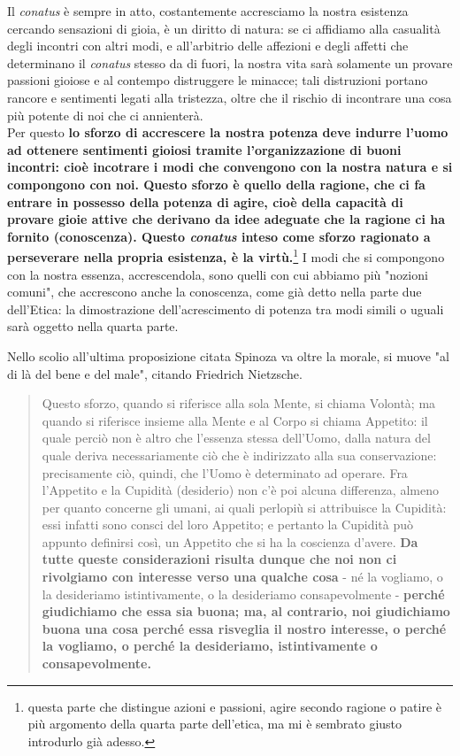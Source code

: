 Il \textit{conatus} è sempre in atto, costantemente accresciamo la nostra esistenza cercando sensazioni di gioia, è un diritto di natura: se ci affidiamo alla casualità degli incontri con altri modi, e all'arbitrio delle affezioni e degli affetti che determinano il \textit{conatus} stesso da di fuori, la nostra vita sarà solamente un provare passioni gioiose e al contempo distruggere le minacce; tali distruzioni portano rancore e sentimenti legati alla tristezza, oltre che il rischio di incontrare una cosa più potente di noi che ci annienterà.\\
Per questo  \textbf{lo sforzo di accrescere la nostra potenza deve indurre l'uomo ad ottenere sentimenti gioiosi tramite l'organizzazione di buoni incontri: cioè incotrare i modi che convengono con la nostra natura e si compongono con noi. Questo sforzo è quello della ragione, che ci fa entrare in possesso della potenza di agire, cioè della capacità di provare gioie attive che derivano da idee adeguate che la ragione ci ha fornito (conoscenza). Questo \textit{conatus} inteso come sforzo ragionato a perseverare nella propria esistenza, è la virtù.}\footnote{questa parte che distingue azioni e passioni, agire secondo ragione o patire è più argomento della quarta parte dell'etica, ma mi è sembrato giusto introdurlo già adesso.} I modi che si compongono con la nostra essenza, accrescendola, sono quelli con cui abbiamo più "nozioni comuni", che accrescono anche la conoscenza, come già detto nella parte due dell'Etica: la dimostrazione dell'acrescimento di potenza tra modi simili o uguali sarà oggetto nella quarta parte.

Nello scolio all'ultima proposizione citata Spinoza va oltre la morale, si muove "al di là del bene e del male", citando Friedrich Nietzsche.

\begin{quotation}
	\small Questo sforzo, quando si riferisce alla sola Mente, si chiama Volontà; ma
	quando si riferisce insieme alla Mente e al Corpo si chiama Appetito: il quale perciò non è
	altro che l’essenza stessa dell’Uomo, dalla natura del quale deriva necessariamente ciò che
	è indirizzato alla sua conservazione: precisamente ciò, quindi, che l’Uomo è determinato
	ad operare. Fra l’Appetito e la Cupidità (desiderio) non c’è poi alcuna differenza, almeno per quanto
	concerne gli umani, ai quali perlopiù si attribuisce la Cupidità: essi infatti sono consci del loro Appetito; e pertanto la Cupidità può appunto definirsi così, un Appetito che si ha la
	coscienza d’avere. \textbf{Da tutte queste considerazioni risulta dunque che noi non ci rivolgiamo
		con interesse verso una qualche cosa} - né la vogliamo, o la desideriamo istintivamente, o la
	desideriamo consapevolmente - \textbf{perché giudichiamo che essa sia buona; ma, al contrario,
		noi giudichiamo buona una cosa perché essa risveglia il nostro interesse, o perché la vogliamo, o perché la desideriamo, istintivamente o consapevolmente.}
\end{quotation}

